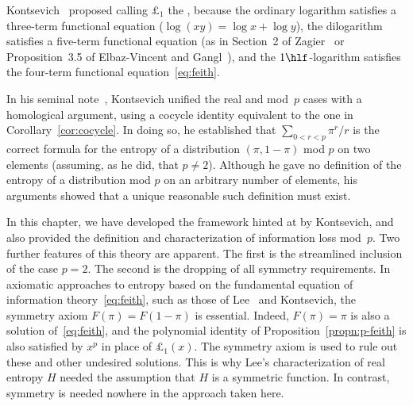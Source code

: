 Kontsevich~\cite{KontOHL}%
%
% 
proposed calling $\pounds_1$ the ,%
%
%
because the ordinary logarithm satisfies a three-term functional equation
($\log(xy) = \log x + \log y$), the dilogarithm satisfies a five-term
functional equation (as in Section~2 of Zagier~\cite{Zagi} or
Proposition~3.5 of Elbaz-Vincent and Gangl~\cite{EVGOPI}), and the
$1\hlf$-logarithm satisfies the four-term functional
equation~\eqref{eq:feith}.

\begin{remark}
In his seminal note~\cite{KontOHL}, Kontsevich%
%
% 
unified the real and mod~$p$ cases with a homological argument, using a
cocycle%
%
% 
identity equivalent to the one in Corollary~\ref{cor:cocycle}.  In doing so,
he established that $\sum_{0 < r < p} \pi^r/r$ is the correct formula for
the entropy of a distribution $(\pi, 1 - \pi)$ mod $p$ on two
elements (assuming, as he did, that $p \neq 2$).  Although he gave no
definition of the entropy of a distribution mod $p$ on an
arbitrary number of elements, his arguments showed that a unique reasonable
such definition must exist.

In this chapter, we have developed the framework hinted at by Kontsevich,
and also provided the definition and characterization of information
loss mod~$p$.  Two further features of this theory are apparent. The first
is the streamlined inclusion of the case $p = 2$.  The second is the
dropping of all symmetry%
%
%
%
requirements.  In axiomatic approaches to entropy based on the fundamental
equation of information theory~\eqref{eq:feith}, such as those of
Lee~\cite{Lee} and Kontsevich, the symmetry axiom $F(\pi) = F(1 - \pi)$ is
essential.  Indeed, $F(\pi) = \pi$ is also a solution of~\eqref{eq:feith},
and the polynomial identity of Proposition~\ref{propn:p-feith} is also
satisfied by $x^p$ in place of $\pounds_1(x)$.  The symmetry axiom is used
to rule out these and other undesired solutions.  This is why Lee's
characterization of real entropy $H$ needed the assumption that $H$ is a
symmetric function.  In contrast, symmetry is needed nowhere in the
approach taken here.
\end{remark}





